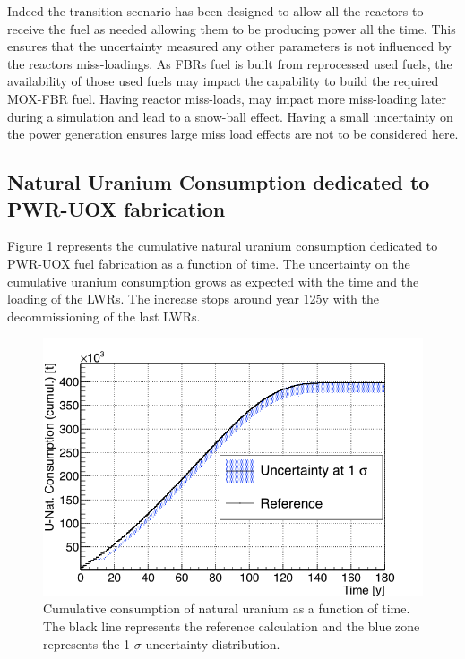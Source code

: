 \documentclass{anstrans}
\begin{document}
Indeed the transition scenario has been designed to allow all the reactors to
receive the fuel as needed allowing them to be producing power all the time.
This ensures that the uncertainty measured any other parameters is not
influenced by the reactors miss-loadings.  As \glspl{FBR} fuel is built from
reprocessed used fuels, the availability of those used fuels may impact the
capability to build the required MOX-FBR fuel.  Having reactor miss-loads, may
impact more miss-loading later during a simulation and lead to a snow-ball
effect.  Having a small uncertainty on the power generation ensures large miss
load effects are not to be considered here.  

\subsection{Natural Uranium Consumption dedicated to PWR-UOX fabrication}

Figure \ref{fig:unat_full} represents the cumulative natural uranium consumption
dedicated to PWR-UOX fuel fabrication as a function of time.  The uncertainty on
the cumulative uranium consumption grows as expected with the time and the
loading of the \glspl{LWR}.  The increase stops around year 125y with the
decommissioning of the last \glspl{LWR}.

\begin{figure}[ht] %
    \centering
    \includegraphics[scale=0.35]{unat_full}
    \caption{Cumulative consumption of natural uranium as a function of time.  The black line
        represents the reference calculation and the blue zone
        represents the 1 $\sigma$ uncertainty distribution.}\label{fig:unat_full}
\end{figure}
\end{document}
